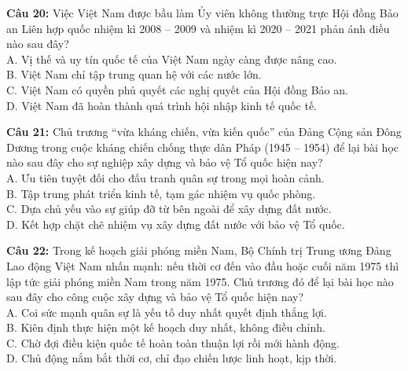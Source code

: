 \documentclass[12pt,a4paper]{article}
\begin{document}
\noindent \textbf{Câu 20:} Việc Việt Nam được bầu làm Ủy viên không thường trực Hội đồng Bảo an Liên hợp quốc nhiệm kì 2008 -- 2009 và nhiệm kì 2020 -- 2021 phản ánh điều nào sau đây?\\
\noindent A. Vị thế và uy tín quốc tế của Việt Nam ngày càng được nâng cao.\\
\noindent B. Việt Nam chỉ tập trung quan hệ với các nước lớn.\\
\noindent C. Việt Nam có quyền phủ quyết các nghị quyết của Hội đồng Bảo an.\\
\noindent D. Việt Nam đã hoàn thành quá trình hội nhập kinh tế quốc tế.

\noindent \textbf{Câu 21:} Chủ trương ``vừa kháng chiến, vừa kiến quốc'' của Đảng Cộng sản Đông Dương trong cuộc kháng chiến chống thực dân Pháp (1945 -- 1954) để lại bài học nào sau đây cho sự nghiệp xây dựng và bảo vệ Tổ quốc hiện nay?\\
\noindent A. Ưu tiên tuyệt đối cho đấu tranh quân sự trong mọi hoàn cảnh.\\
\noindent B. Tập trung phát triển kinh tế, tạm gác nhiệm vụ quốc phòng.\\
\noindent C. Dựa chủ yếu vào sự giúp đỡ từ bên ngoài để xây dựng đất nước.\\
\noindent D. Kết hợp chặt chẽ nhiệm vụ xây dựng đất nước với bảo vệ Tổ quốc.

\noindent \textbf{Câu 22:} Trong kế hoạch giải phóng miền Nam, Bộ Chính trị Trung ương Đảng Lao động Việt Nam nhấn mạnh: nếu thời cơ đến vào đầu hoặc cuối năm 1975 thì lập tức giải phóng miền Nam trong năm 1975. Chủ trương đó để lại bài học nào sau đây cho công cuộc xây dựng và bảo vệ Tổ quốc hiện nay?\\
\noindent A. Coi sức mạnh quân sự là yếu tố duy nhất quyết định thắng lợi.\\
\noindent B. Kiên định thực hiện một kế hoạch duy nhất, không điều chỉnh.\\
\noindent C. Chờ đợi điều kiện quốc tế hoàn toàn thuận lợi rồi mới hành động.\\
\noindent D. Chủ động nắm bắt thời cơ, chỉ đạo chiến lược linh hoạt, kịp thời.
\end{document}
